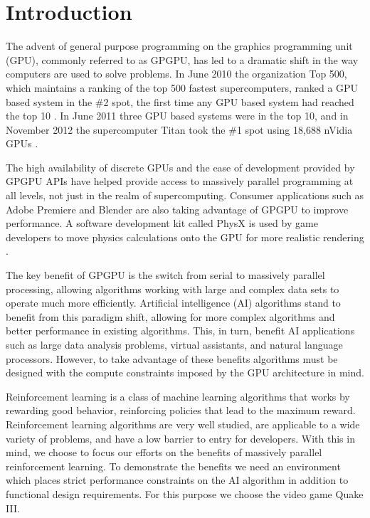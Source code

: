 \chapter{Introduction}

The advent of general purpose programming on the graphics programming unit (GPU), commonly referred to as GPGPU, has led to a dramatic shift in the way computers are used to solve problems. In June 2010 the organization Top 500, which maintains a ranking of the top 500 fastest supercomputers, ranked a GPU based system in the \#2 spot, the first time any GPU based system had reached the top 10 \cite{top500:2010}. In June 2011 three GPU based systems were in the top 10, and in November 2012 the supercomputer Titan took the \#1 spot using 18,688 nVidia GPUs \cite{top500:2011} \cite{top500:2012}.

The high availability of discrete GPUs and the ease of development provided by GPGPU APIs have helped provide access to massively parallel programming at all levels, not just in the realm of supercomputing. Consumer applications such as Adobe Premiere \cite{adobe} and Blender \cite{blender} are also taking advantage of GPGPU to improve performance. A software development kit called PhysX is used by game developers to move physics calculations onto the GPU for more realistic rendering \cite{physx}.

The key benefit of GPGPU is the switch from serial to massively parallel processing, allowing algorithms working with large and complex data sets to operate much more efficiently. Artificial intelligence (AI) algorithms stand to benefit from this paradigm shift, allowing for more complex algorithms and better performance in existing algorithms. This, in turn, benefit AI applications such as large data analysis problems, virtual assistants, and natural language processors. However, to take advantage of these benefits algorithms must be designed with the compute constraints imposed by the GPU architecture in mind.

Reinforcement learning is a class of machine learning algorithms that works by rewarding good behavior, reinforcing policies that lead to the maximum reward. Reinforcement learning algorithms are very well studied, are applicable to a wide variety of problems, and have a low barrier to entry for developers. With this in mind, we choose to focus our efforts on the benefits of massively parallel reinforcement learning. To demonstrate the benefits we need an environment which places strict performance constraints on the AI algorithm in addition to functional design requirements. For this purpose we choose the video game Quake III.

